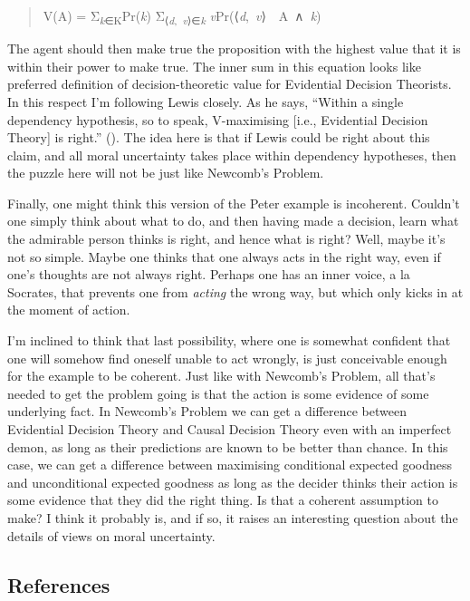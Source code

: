 \documentclass[
  10pt,
  letterpaper,
  DIV=11,
  numbers=noendperiod,
  twoside]{scrartcl}
\begin{document}
\begin{quote}
V(A) = Σ\textsubscript{\emph{k}∈K}Pr(\emph{k})
Σ\textsubscript{⟨\emph{d},~\emph{v}⟩∈\emph{k}}
\emph{v}Pr(⟨\emph{d},~\emph{v}⟩~\textbar~A~∧~\emph{k})
\end{quote}

The agent should then make true the proposition with the highest value
that it is within their power to make true. The inner sum in this
equation looks like preferred definition of decision-theoretic value for
Evidential Decision Theorists. In this respect I'm following Lewis
closely. As he says, ``Within a single dependency hypothesis, so to
speak, V-maximising {[}i.e., Evidential Decision Theory{]} is right.''
(). The idea here is that if
Lewis could be right about this claim, and all moral uncertainty takes
place within dependency hypotheses, then the puzzle here will not be
just like Newcomb's Problem.

Finally, one might think this version of the Peter example is
incoherent. Couldn't one simply think about what to do, and then having
made a decision, learn what the admirable person thinks is right, and
hence what is right? Well, maybe it's not so simple. Maybe one thinks
that one always acts in the right way, even if one's thoughts are not
always right. Perhaps one has an inner voice, a la Socrates, that
prevents one from \emph{acting} the wrong way, but which only kicks in
at the moment of action.

I'm inclined to think that last possibility, where one is somewhat
confident that one will somehow find oneself unable to act wrongly, is
just conceivable enough for the example to be coherent. Just like with
Newcomb's Problem, all that's needed to get the problem going is that
the action is some evidence of some underlying fact. In Newcomb's
Problem we can get a difference between Evidential Decision Theory and
Causal Decision Theory even with an imperfect demon, as long as their
predictions are known to be better than chance. In this case, we can get
a difference between maximising conditional expected goodness and
unconditional expected goodness as long as the decider thinks their
action is some evidence that they did the right thing. Is that a
coherent assumption to make? I think it probably is, and if so, it
raises an interesting question about the details of views on moral
uncertainty.

\subsection*{References}\label{references}
\end{document}
